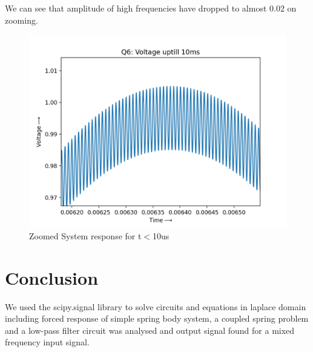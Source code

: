 \documentclass[11pt, a4paper]{article}
\begin{document}
We can see that amplitude of high frequencies have dropped to almost 0.02 on zooming.
\begin{figure}[tbh!]
\includegraphics[scale=0.6]{Q6_3.png}
\centering
\caption{Zoomed System response for t$<$10us}
\label{fig:Zoomed System response for t<10us}
\end{figure}

\section{Conclusion}
We used the scipy.signal library to solve circuits and equations in laplace domain including forced response of simple spring body system, a coupled spring problem and a low-pass filter circuit was analysed and output signal found for a mixed frequency input signal.
\end{document}
